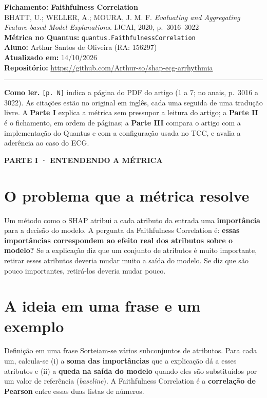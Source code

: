 \documentclass[11pt,a4paper]{article}
\newcommand{\partbar}[1]{\par\vspace{1.2em}\noindent\colorbox{black!80}{\parbox{\dimexpr\linewidth-2\fboxsep}{\color{white}\bfseries\sffamily\MakeUppercase{#1}}}\par\vspace{0.4em}}
\begin{document}
\begin{center}
    {\LARGE \textbf{Fichamento: Faithfulness Correlation}} \\[0.35em]
    {\large BHATT, U.; WELLER, A.; MOURA, J. M. F. \textit{Evaluating and Aggregating Feature-based Model Explanations}. IJCAI, 2020, p.~3016--3022} \\[0.3em]
    \textbf{Métrica no Quantus:} \texttt{quantus.FaithfulnessCorrelation} \\[0.2em]
    \textbf{Aluno:} Arthur Santos de Oliveira (RA: 156297) \\[0.2em]
    \textbf{Atualizado em:} 14/10/2026 \\[0.2em]
    \textbf{Repositório:} \url{https://github.com/Arthur-so/shap-ecg-arrhythmia}
\end{center}
\vspace{-0.5em}
\hrule
\vspace{0.8em}

\textbf{Como ler.} \texttt{[p. N]} indica a página do PDF do artigo (1 a 7; no anais, p.~3016 a 3022). As citações estão no original em inglês, cada uma seguida de uma tradução livre. A \textbf{Parte I} explica a métrica sem pressupor a leitura do artigo; a \textbf{Parte II} é o fichamento, em ordem de páginas; a \textbf{Parte III} compara o artigo com a implementação do Quantus e com a configuração usada no TCC, e avalia a aderência ao caso do ECG.

\partbar{Parte I · Entendendo a métrica}

\section{O problema que a métrica resolve}
Um método como o SHAP atribui a cada atributo da entrada uma \textbf{importância} para a decisão do modelo. A pergunta da Faithfulness Correlation é: \textbf{essas importâncias correspondem ao efeito real dos atributos sobre o modelo?} Se a explicação diz que um conjunto de atributos é muito importante, retirar esses atributos deveria mudar muito a saída do modelo. Se diz que são pouco importantes, retirá-los deveria mudar pouco.

\section{A ideia em uma frase e um exemplo}
\begin{infobox}[note]{Definição em uma frase}
Sorteiam-se vários subconjuntos de atributos. Para cada um, calcula-se (i) a \textbf{soma das importâncias} que a explicação dá a esses atributos e (ii) a \textbf{queda na saída do modelo} quando eles são substituídos por um valor de referência (\textit{baseline}). A Faithfulness Correlation é a \textbf{correlação de Pearson} entre essas duas listas de números.
\end{infobox}
\end{document}
